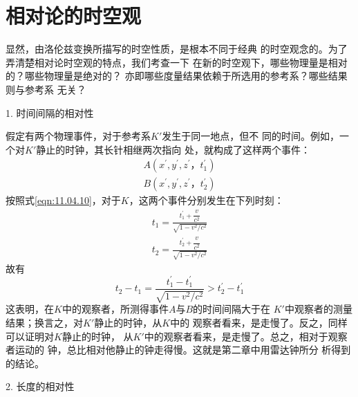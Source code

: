 \section{相对论的时空观}\label{sec:11.05}

显然，由洛伦兹变换所描写的时空性质，是根本不同于经典
的时空观念的。为了弄清楚相对论时空观的特点，我们考查一下
在新的时空观下，哪些物理量是相对的？哪些物理量是绝对的？
亦即哪些度量结果依赖于所选用的参考系？哪些结果则与参考系
无关？

\textsf{1. 时间间隔的相对性}

假定有两个物理事件，对于参考系$ K' $发生于同一地点，但不
同的时间。例如，一个对$ K' $静止的时钟，其长针相继两次指向
处，就构成了这样两个事件：
\begin{align*}
    A \left( x ^ { \prime } , y ^ { \prime } , z ^ { \prime } ， t _ { 1 } ^ { \prime } \right) \\
    B \left( x ^ { \prime } , y ^ { \prime } , z ^ { \prime } ， t _ { 2 } ^ { \prime } \right)
\end{align*}
按照式\eqref{eqn:11.04.10}，对于$ K $，这两个事件分别发生在下列时刻：
\begin{align*}
    t _ { 1 } = \frac { t _ { 1 } ^ { \prime } + \dfrac { v } { c ^ { 2 } } } { \sqrt { 1 - v ^ { 2 } / c ^ { 2 } } }  \\
    t _ { 2 } = \frac { t _ { 2 } ^ { \prime } + \dfrac { v } { c ^ { 2 } } } { \sqrt { 1 - v ^ { 2 } / c ^ { 2 } } }
\end{align*}
故有
\begin{equation}\label{eqn:11.05.01}
    t _ { 2 } - t _ { 1 } = \frac { t _ { 1 } ^ { \prime } - t _ { 1 } ^ { \prime } } { \sqrt{ 1 - v ^ { 2 } / c ^ { 2 } } } > t _ 2 ^ { \prime } - t _ 1 ^ { \prime }
\end{equation}
这表明，在$ K $中的观察者，所测得事件$ A $与$ B $的时间间隔大于在
$ K ' $中观察者的测量结果；换言之，对$ K ' $静止的时钟，从$ K $中的
观察者看来，是走慢了。反之，同样可以证明对$ K $静止的时钟，
从$ K ' $中的观察者看来，是走慢了。总之，相对于观察者运动的
钟，总比相对他静止的钟走得慢。这就是第二章中用雷达钟所分
析得到的结论。

\textsf{2. 长度的相对性}

